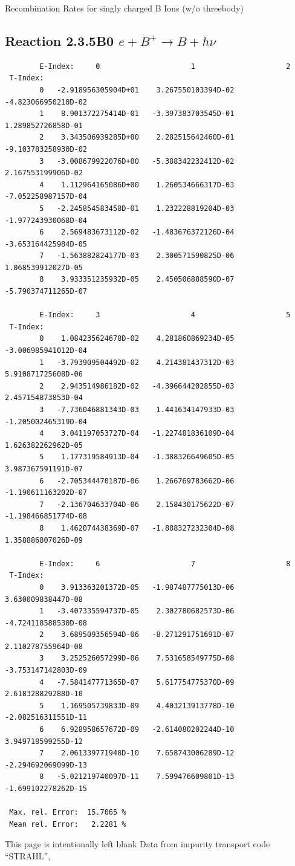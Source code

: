 \documentclass[12pt,dvips]{article}
\begin{document}
  Recombination Rates for singly charged B Ions (w/o threebody)
\subsection{
Reaction 2.3.5B0 $ e + B^+ \rightarrow B + h\nu $
}


\begin{small}\begin{verbatim}
        E-Index:     0                     1                     2
 T-Index:
        0   -2.918956305904D+01    3.267550103394D-02   -4.823066950210D-02
        1    8.901372275414D-01   -3.397383703545D-01    1.289852726858D-01
        2    3.343506939285D+00    2.282515642460D-01   -9.103783258930D-02
        3   -3.008679922076D+00   -5.388342232412D-02    2.167553199906D-02
        4    1.112964165086D+00    1.260534666317D-03   -7.052258987157D-04
        5   -2.245854583458D-01    1.232228819204D-03   -1.977243930068D-04
        6    2.569483673112D-02   -1.483676372126D-04   -3.653164425984D-05
        7   -1.563882824177D-03    2.300571590825D-06    1.068539912027D-05
        8    3.933351235932D-05    2.450506888590D-07   -5.790374711265D-07

        E-Index:     3                     4                     5
 T-Index:
        0    1.084235624678D-02    4.281860869234D-05   -3.006985941012D-04
        1   -3.793909504492D-02    4.214381437312D-03    5.910871725608D-06
        2    2.943514986182D-02   -4.396644202855D-03    2.457154873853D-04
        3   -7.736046881343D-03    1.441634147933D-03   -1.205002465319D-04
        4    3.041197053727D-04   -1.227481836109D-04    1.626382262962D-05
        5    1.177319584913D-04   -1.388326649605D-05    3.987367591191D-07
        6   -2.705344470187D-06    1.266769783662D-06   -1.190611163202D-07
        7   -2.136704633704D-06    2.158430175622D-07   -1.198466851774D-08
        8    1.462074438369D-07   -1.888327232304D-08    1.358886807026D-09

        E-Index:     6                     7                     8
 T-Index:
        0    3.913363201372D-05   -1.987487775013D-06    3.630009838447D-08
        1   -3.407335594737D-05    2.302780682573D-06   -4.724118588530D-08
        2    3.689509356594D-06   -8.271291751691D-07    2.110278755964D-08
        3    3.252526057299D-06    7.531658549775D-08   -3.753147142803D-09
        4   -7.584147771365D-07    5.617754775370D-09    2.618328829288D-10
        5    1.169505739833D-09    4.403213913778D-10   -2.082516311551D-11
        6    6.928958657672D-09   -2.614080202244D-10    3.949718599255D-12
        7    2.061339771948D-10    7.658743006289D-12   -2.294692069099D-13
        8   -5.021219740097D-11    7.599476609801D-13   -1.699102278262D-15

 Max. rel. Error:  15.7065 %
 Mean rel. Error:   2.2281 %

\end{verbatim}\end{small}
\newpage
This page is intentionally left blank
\newpage
Data from impurity transport code ``STRAHL'', \cite{kn:Behringer}
\end{document}
